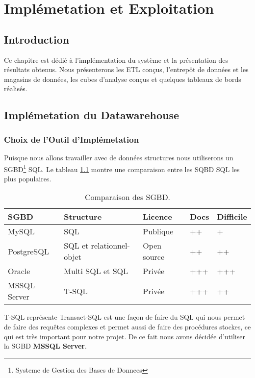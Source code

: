 \chapter{Implémetation et Exploitation}

\section*{Introduction}%
%
Ce chapitre est dédié à l’implémentation du système et la présentation des résultats obtenus. Nous présenterons les ETL conçus, l’entrepôt de données et les magasins de données, les cubes d’analyse conçus et quelques tableaux de bords réalisés. 

\section{Implémetation du Datawarehouse}
\subsection{Choix de l'Outil d'Implémetation}
Puisque nous allons travailler avec de données structures nous utiliserons un SGBD\footnote{Systeme de Gestion des Bases de Donnees} SQL. Le tableau \ref{tab:comparaisonsgbd} montre une comparaison entre les SQBD SQL les plus populaires.
\begin{table}[H]
    \centering
    \caption{Comparaison des SGBD.}
    \begin{tabular}[t]{|p{3cm}|p{4.5cm}|p{3cm}|p{1.5cm}|p{2cm}|} 
        \hline
        \textbf{SGBD} & \textbf{Structure} & \textbf{Licence} & \textbf{Docs} & \textbf{Difficile } \\
        \hline\hline
        MySQL & SQL & Publique & ++ & + \\
        \hline
        PostgreSQL & SQL et relationnel-objet & Open source & ++ & ++ \\
        \hline
        Oracle & Multi SQL et SQL & Privée & +++ & +++ \\
        \hline
        MSSQL Server & T-SQL & Privée & +++ & ++ \\
        \hline\hline
    \end{tabular}
    \label{tab:comparaisonsgbd}
\end{table}%
T-SQL représente Transact-SQL est une façon de faire du SQL qui nous permet de faire des requêtes complexes et permet aussi de faire des procédures stockes, ce qui est très important pour notre projet. De ce fait nous avons décidée d’utiliser la SGBD \textbf{MSSQL Server}.
